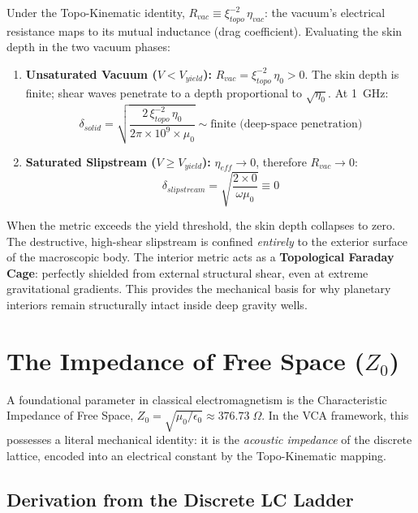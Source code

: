 Under the Topo-Kinematic identity, $R_{vac} \equiv \xi_{topo}^{-2}\, \eta_{vac}$: the vacuum's electrical resistance maps to its mutual inductance (drag coefficient). Evaluating the skin depth in the two vacuum phases:

\begin{enumerate}
    \item \textbf{Unsaturated Vacuum ($V < V_{yield}$):} $R_{vac} = \xi_{topo}^{-2}\, \eta_0 > 0$. The skin depth is finite; shear waves penetrate to a depth proportional to $\sqrt{\eta_0}$. At 1~GHz:
    \begin{equation}
        \delta_{solid} = \sqrt{\frac{2\, \xi_{topo}^{-2}\, \eta_0}{2\pi \times 10^9 \times \mu_0}} \sim \text{finite (deep-space penetration)}
    \end{equation}

    \item \textbf{Saturated Slipstream ($V \geq V_{yield}$):} $\eta_{eff} \to 0$, therefore $R_{vac} \to 0$:
    \begin{equation}
        \delta_{slipstream} = \sqrt{\frac{2 \times 0}{\omega\mu_0}} \equiv 0
    \end{equation}
\end{enumerate}

When the metric exceeds the yield threshold, the skin depth collapses to zero. The destructive, high-shear slipstream is confined \textit{entirely} to the exterior surface of the macroscopic body. The interior metric acts as a \textbf{Topological Faraday Cage}: perfectly shielded from external structural shear, even at extreme gravitational gradients. This provides the mechanical basis for why planetary interiors remain structurally intact inside deep gravity wells.
\section{The Impedance of Free Space (\texorpdfstring{$Z_0$}{Z0})}
\label{sec:z0_derivation}

A foundational parameter in classical electromagnetism is the Characteristic Impedance of Free Space, $Z_0 = \sqrt{\mu_0/\epsilon_0} \approx 376.73\;\Omega$. In the VCA framework, this possesses a literal mechanical identity: it is the \textit{acoustic impedance} of the discrete lattice, encoded into an electrical constant by the Topo-Kinematic mapping.

\subsection{Derivation from the Discrete LC Ladder}


